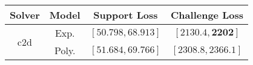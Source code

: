 \begin{tabular}{cc|c|c} 
\hline 
 Solver & Model & Support Loss  & Challenge Loss \tabularnewline\hline 
\hline 
\multirow{2}{*}{c2d} & Exp. & $\mathbf{\left[50.798,68.913\right]}$ & $\mathbf{\left[2130.4,2202\right]}$ \tabularnewline 
 & Poly. & $\left[51.684,69.766\right]$ & $\left[2308.8,2366.1\right]$ \tabularnewline 
\hline 
\end{tabular} 

